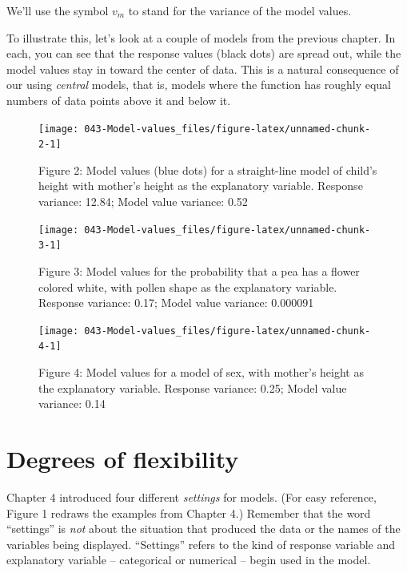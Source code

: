 \documentclass[]{book}
\begin{document}
We'll use the symbol \(v_m\) to stand for the variance of the model values.

To illustrate this, let's look at a couple of models from the previous chapter. In each, you can see that the response values (black dots) are spread out, while the model values stay in toward the center of data. This is a natural consequence of our using \emph{central} models, that is, models where the function has roughly equal numbers of data points above it and below it.

\begin{figure}\texttt{[image: 043-Model-values\_files/figure-latex/unnamed-chunk-2-1]} \caption{Figure 2: Model values (blue dots) for a straight-line model of child's height with mother's height as the explanatory variable. Response variance: 12.84; Model value variance: 0.52}\label{fig:unnamed-chunk-2}
\end{figure}



\begin{figure}\texttt{[image: 043-Model-values\_files/figure-latex/unnamed-chunk-3-1]} \caption{Figure 3: Model values for the probability that a pea has a flower colored white, with pollen shape as the explanatory variable. Response variance: 0.17; Model value variance: 0.000091}\label{fig:unnamed-chunk-3}
\end{figure}



\begin{figure}\texttt{[image: 043-Model-values\_files/figure-latex/unnamed-chunk-4-1]} \caption{Figure 4: Model values for a model of sex, with mother's height as the explanatory variable. Response variance: 0.25; Model value variance: 0.14}\label{fig:unnamed-chunk-4}
\end{figure}



\hypertarget{degrees-of-flexibility}{%
\chapter{Degrees of flexibility}\label{degrees-of-flexibility}}

Chapter 4 introduced four different \emph{settings} for models. (For easy reference, Figure 1 redraws the examples from Chapter 4.) Remember that the word ``settings'' is \emph{not} about the situation that produced the data or the names of the variables being displayed. ``Settings'' refers to the kind of response variable and explanatory variable -- categorical or numerical -- begin used in the model.
\end{document}
